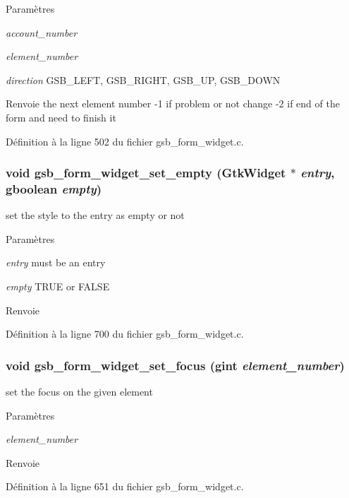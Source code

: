 \begin{DoxyParams}{Paramètres}
\item[{\em account\_\-number}]\item[{\em element\_\-number}]\item[{\em direction}]GSB\_\-LEFT, GSB\_\-RIGHT, GSB\_\-UP, GSB\_\-DOWN\end{DoxyParams}
\begin{DoxyReturn}{Renvoie}
the next element number -\/1 if problem or not change -\/2 if end of the form and need to finish it 
\end{DoxyReturn}


Définition à la ligne 502 du fichier gsb\_\-form\_\-widget.c.

\subsubsection[{gsb\_\-form\_\-widget\_\-set\_\-empty}]{\setlength{\rightskip}{0pt plus 5cm}void gsb\_\-form\_\-widget\_\-set\_\-empty (GtkWidget $\ast$ {\em entry}, \/  gboolean {\em empty})}\label{gsb__form__widget_8h_a0b68e260dc6da6f49888145c901faaa9}
set the style to the entry as empty or not


\begin{DoxyParams}{Paramètres}
\item[{\em entry}]must be an entry \item[{\em empty}]TRUE or FALSE\end{DoxyParams}
\begin{DoxyReturn}{Renvoie}

\end{DoxyReturn}


Définition à la ligne 700 du fichier gsb\_\-form\_\-widget.c.

\subsubsection[{gsb\_\-form\_\-widget\_\-set\_\-focus}]{\setlength{\rightskip}{0pt plus 5cm}void gsb\_\-form\_\-widget\_\-set\_\-focus (gint {\em element\_\-number})}\label{gsb__form__widget_8h_a44684cf3788bb37368da547e0a7c7296}
set the focus on the given element


\begin{DoxyParams}{Paramètres}
\item[{\em element\_\-number}]\end{DoxyParams}
\begin{DoxyReturn}{Renvoie}

\end{DoxyReturn}


Définition à la ligne 651 du fichier gsb\_\-form\_\-widget.c.

